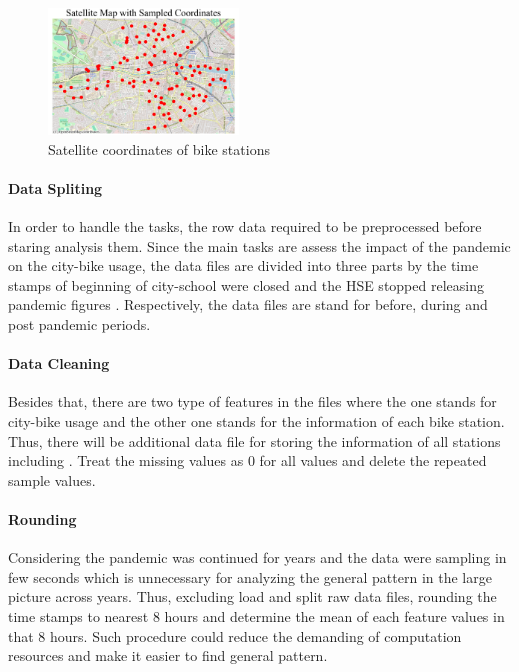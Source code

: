 \begin{figure}[H]
    \centering
    \includegraphics[width=0.45\textwidth]{chap/fig0.png}
    \caption{
        \footnotesize
        Satellite coordinates of bike stations
        } %
    \label{FIGURES: CORRD}
\end{figure}

\paragraph{Data Spliting}
In order to handle the tasks, the row data required to be preprocessed before 
staring analysis them. Since the main tasks are assess the impact of the 
pandemic on the city-bike usage, the data files are divided into three parts 
by the time stamps of beginning of city-school were closed 
\cite{OHalloran2020Pandemic} and the 
HSE stopped releasing pandemic figures \cite{OHalloran2022Pandemic}. 
Respectively, the data files 
are stand for before, during and post pandemic periods.

\paragraph{Data Cleaning} 
Besides that, there are two type of features in the files where the one stands for 
city-bike usage and the other one stands for the information of each bike station.
Thus, there will be additional data file for storing the information of all stations 
including .
Treat the missing values as 0 for all values and delete the repeated sample values.

\paragraph{Rounding}
Considering the pandemic was continued for years and the data were sampling in few 
seconds which is unnecessary for analyzing the general pattern in the large picture 
across years. Thus, excluding load and split raw data files, rounding the 
time stamps to nearest 8 hours and determine the mean of each feature values in 
that 8 hours. Such procedure could reduce the demanding of computation resources and 
make it easier to find general pattern.


